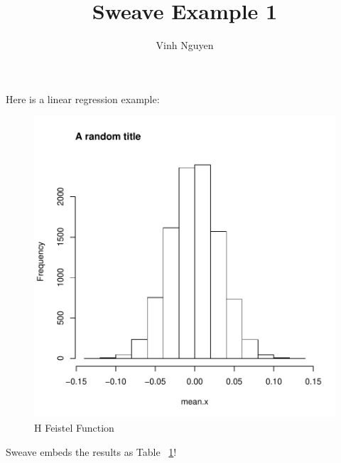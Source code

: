 \documentclass[a4paper]{article}
\title{Sweave Example 1}
\author{Vinh Nguyen}
\begin{document}
\maketitle
Here is a linear regression example:


\begin{figure}
\captionsetup{justification=raggedright, singlelinecheck=false} %
\caption{H Feistel Function}
\label{fig:graph}
\includegraphics{test-figplot}
\end{figure}
Sweave embeds the results as Table ~\ref{fig:graph}!
\end{document}
